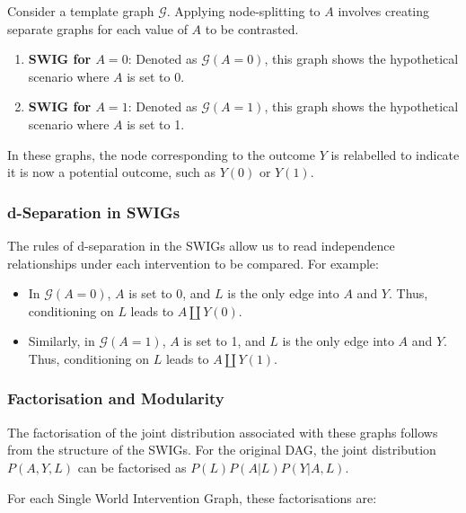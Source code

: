 \documentclass[
  single column]{article}
\providecommand{\tightlist}{%
  \setlength{\itemsep}{0pt}\setlength{\parskip}{0pt}}\usepackage{longtable,booktabs,array}
\begin{document}
Consider a template graph \(\mathcal{G}\). Applying node-splitting to
\(A\) involves creating separate graphs for each value of \(A\) to be
contrasted.

\begin{enumerate}
\def\labelenumi{\arabic{enumi}.}
\tightlist
\item
  \textbf{SWIG for \(A = 0\)}: Denoted as \(\mathcal{G}(A=0)\), this
  graph shows the hypothetical scenario where \(A\) is set to 0.
\item
  \textbf{SWIG for \(A = 1\)}: Denoted as \(\mathcal{G}(A=1)\), this
  graph shows the hypothetical scenario where \(A\) is set to 1.
\end{enumerate}

In these graphs, the node corresponding to the outcome \(Y\) is
relabelled to indicate it is now a potential outcome, such as \(Y(0)\)
or \(Y(1)\).

\subsubsection{d-Separation in SWIGs}\label{d-separation-in-swigs}

The rules of d-separation in the SWIGs allow us to read independence
relationships under each intervention to be compared. For example:

\begin{itemize}
\tightlist
\item
  In \(\mathcal{G}(A=0)\), \(A\) is set to 0, and \(L\) is the only edge
  into \(A\) and \(Y\). Thus, conditioning on \(L\) leads to
  \(A \coprod Y(0)\).
\item
  Similarly, in \(\mathcal{G}(A=1)\), \(A\) is set to 1, and \(L\) is
  the only edge into \(A\) and \(Y\). Thus, conditioning on \(L\) leads
  to \(A \coprod Y(1)\).
\end{itemize}

\subsubsection{Factorisation and
Modularity}\label{factorisation-and-modularity}

The factorisation of the joint distribution associated with these graphs
follows from the structure of the SWIGs. For the original DAG, the joint
distribution \(P(A, Y, L)\) can be factorised as \(P(L)P(A|L)P(Y|A,L)\).

For each Single World Intervention Graph, these factorisations are:
\end{document}
